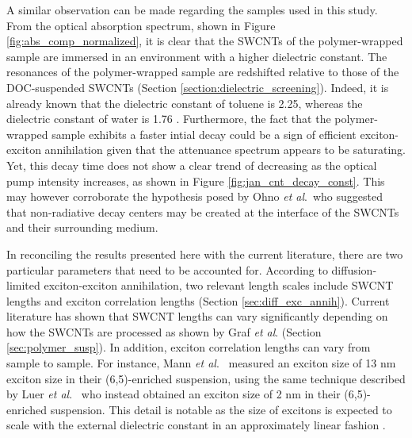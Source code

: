 A similar observation can be made regarding the samples used in this study. From the optical absorption spectrum, shown in Figure \ref{fig:abs_comp_normalized}, it is clear that the SWCNTs of the polymer-wrapped sample are immersed in an environment with a higher dielectric constant. The resonances of the polymer-wrapped sample are redshifted relative to those of the DOC-suspended SWCNTs (Section \ref{section:dielectric_screening}). Indeed, it is already known that the dielectric constant of toluene is 2.25, whereas the dielectric constant of water is 1.76 \cite{samoc2003dispersion}. Furthermore, the fact that the polymer-wrapped sample exhibits a faster intial decay could be a sign of efficient exciton-exciton annihilation given that the attenuance spectrum appears to be saturating. Yet, this decay time does not show a clear trend of decreasing as the optical pump intensity increases, as shown in Figure \ref{fig:jan_cnt_decay_const}. This may however corroborate the hypothesis posed by Ohno \textit{et al}.\ who suggested that non-radiative decay centers may be created at the interface of the SWCNTs and their surrounding medium.

In reconciling the results presented here with the current literature, there are two particular parameters that need to be accounted for. According to diffusion-limited exciton-exciton annihilation, two relevant length scales include SWCNT lengths and exciton correlation lengths (Section \ref{sec:diff_exc_annih}). Current literature has shown that SWCNT lengths can vary significantly depending on how the SWCNTs are processed as shown by Graf \textit{et al}. \cite{graf2016large} (Section \ref{sec:polymer_susp}). In addition, exciton correlation lengths can vary from sample to sample. For instance, Mann \textit{et al}.\ \cite{mann201613} measured an exciton size of  13 nm exciton size in their (6,5)-enriched suspension, using the same technique described by Luer \textit{et al}.\ \cite{luer2009size} who instead obtained an exciton size of 2 nm in their (6,5)-enriched suspension. This detail is notable as the size of excitons is expected to scale with the external dielectric constant in an approximately linear fashion \cite{perebeinos2004scaling}.   %

